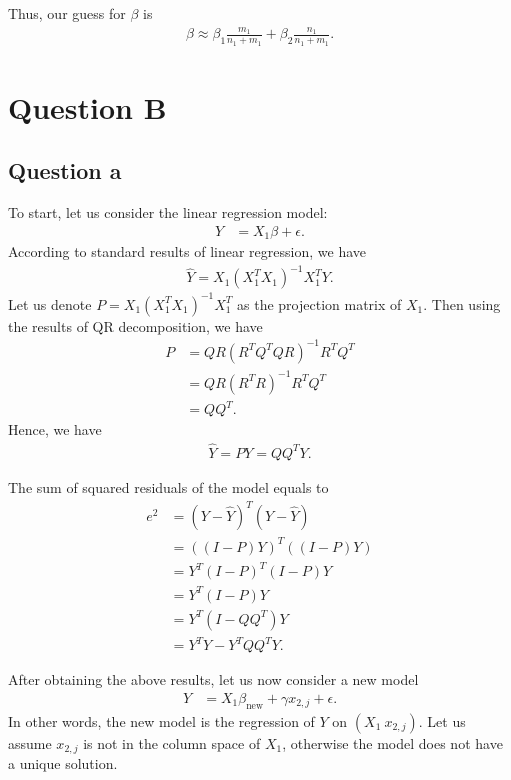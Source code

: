 \documentclass[12pt]{article}
\newcommand{\n}{n}
\newcommand{\nln}[1]{\n_{1}}
\newcommand{\m}{m}
\newcommand{\mln}[1]{\m_{1}}
\newcommand{\xln}[1]{x_{#1}}
\newcommand{\bet}{\beta}
\newcommand{\betln}[1]{\bet_{#1}}
\begin{document}
Thus, our guess for $\bet$ is
\begin{align*}
	\bet \approx \betln{1} \frac{\mln{1}}{\nln{1} + \mln{1}} + \betln{2} \frac{\nln{1}}{\nln{1} + \mln{1}}.
\end{align*} 

\clearpage
\section{Question B}

\subsection{Question a}

To start, let us consider the linear regression model:
\begin{align*}
	Y &= X_1 \bet  + \epsilon.
\end{align*}
According to standard results of linear regression, we have
\begin{align*}
	\hat{Y} = X_1 (X_1^TX_1)^{-1}X_1^TY.
\end{align*}
Let us denote $P = X_1 (X_1^TX_1)^{-1}X_1^T$ as
the projection matrix of $X_1$. Then using the results
of QR decomposition, we have
\begin{align*}
	P &= QR(R^TQ^TQR)^{-1}R^TQ^T\\
	&=QR(R^TR)^{-1}R^TQ^T\\
	&=QQ^T.
\end{align*}
Hence, we have
\begin{align*}
	\hat{Y} = PY = QQ^TY.
\end{align*}

The sum of squared residuals of the model equals to
\begin{align}
	e^2 &= (Y-\hat{Y})^T(Y-\hat{Y})\nonumber\\
	& = ((I - P)Y)^T((I-P)Y)\nonumber\\
	& = Y^T(I-P)^T(I-P)Y\nonumber\\
	& = Y^T(I-P)Y\nonumber\\
	& = Y^T(I - QQ^T)Y \nonumber \\
	& = Y^TY - Y^TQQ^TY.\label{eqn:3}
\end{align}

After obtaining the above results, let us now
consider a new model 
\begin{align}
	Y &= X_1 \betln{\text{new}} + \gamma \xln{2, j} + \epsilon. \label{eqn:7}
\end{align}
In other words, the new model is the regression of $Y$ on $(X_1~x_{2,j})$.
Let us assume $x_{2,j}$ is not in the column space of $X_1$, otherwise
the model does not have a unique solution.
\end{document}
